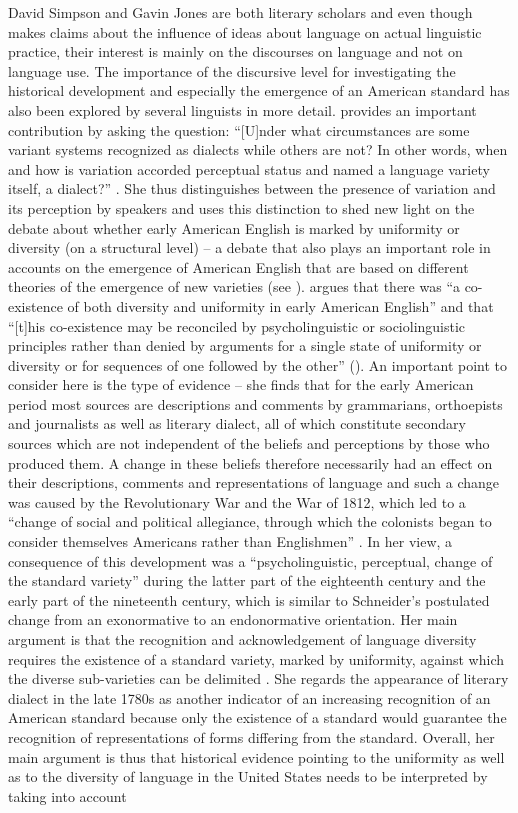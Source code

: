 David Simpson and Gavin Jones are both literary scholars and even though \citet[11]{Simpson1986} makes claims about the influence of ideas about language on actual linguistic practice, their interest is mainly on the discourses on language and not on language use. The importance of the discursive level for investigating the historical development and especially the emergence of an American standard has also been explored by several linguists in more detail. \citet{Cooley1992} provides an important contribution by asking the question: “[U]nder what circumstances are some variant systems recognized as dialects while others are not? In other words, when and how is variation accorded perceptual status and named a language variety itself, a dialect?” \citep[167]{Cooley1992}. She thus distinguishes between the presence of variation and its perception by speakers and uses this distinction to shed new light on the debate about whether early American English is marked by uniformity or diversity (on a structural level) – a debate that also plays an important role in accounts on the emergence of American English that are based on different theories of the emergence of new varieties (see ). \citet{Cooley1992} argues that there was “a co-existence of both diversity and uniformity in early American English” and that “[t]his co-existence may be reconciled by psycholinguistic or sociolinguistic principles rather than denied by arguments for a single state of uniformity or diversity or for sequences of one followed by the other” (\citeyear[168]{Cooley1992}). An important point to consider here is the type of evidence – she finds that for the early American period most sources are descriptions and comments by grammarians, orthoepists and journalists as well as literary dialect, all of which constitute secondary sources which are not independent of the beliefs and perceptions by those who produced them. A change in these beliefs therefore necessarily had an effect on their descriptions, comments and representations of language and such a change was caused by the Revolutionary War and the War of 1812, which led to a “change of social and political allegiance, through which the colonists began to consider themselves Americans rather than Englishmen” \citep[180]{Cooley1992}. In her view, a consequence of this development was a “psycholinguistic, perceptual, change of the standard variety” during the latter part of the eighteenth century and the early part of the nineteenth century, which is similar to Schneider’s postulated change from an exonormative to an endonormative orientation. Her main argument is that the recognition and acknowledgement of language diversity requires the existence of a standard variety, marked by uniformity, against which the diverse sub-varieties can be delimited \citep[180]{Cooley1992}. She regards the appearance of literary dialect in the late 1780s as another indicator of an increasing recognition of an American standard because only the existence of a standard would guarantee the recognition of representations of forms differing from the standard. Overall, her main argument is thus that historical evidence pointing to the uniformity as well as to the diversity of language in the United States needs to be interpreted by taking into account 